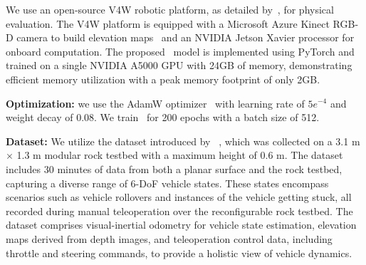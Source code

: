 
We use an open-source V4W robotic platform, as detailed by~\citet{datar2024wheeled}, for physical evaluation. The V4W platform is equipped with a Microsoft Azure Kinect RGB-D camera to build elevation maps~\cite{miki2022elevation} and an NVIDIA Jetson Xavier processor for onboard computation. The proposed \former~model is implemented using PyTorch and trained on a single NVIDIA A5000 GPU with 24GB of memory, demonstrating efficient memory utilization with a peak memory footprint of only 2GB.

\noindent\textbf{Optimization:} we use the AdamW optimizer~\cite{loshchilov2019decoupled} with learning rate of $5e^{-4}$ and weight decay of $0.08$. We train \former~for 200 epochs with a batch size of 512.



\noindent\textbf{Dataset:} We utilize the dataset introduced by \tal~\cite{datar2024terrainattentive}, which was collected on a 3.1 m $\times$ 1.3 m modular rock testbed with a maximum height of 0.6 m. The dataset includes 30 minutes of data from both a planar surface and the rock testbed, capturing a diverse range of 6-DoF vehicle states. These states encompass scenarios such as vehicle rollovers and instances of the vehicle getting stuck, all recorded during manual teleoperation over the reconfigurable rock testbed. 
The dataset comprises visual-inertial odometry for vehicle state estimation, elevation maps derived from depth images, and teleoperation control data, including throttle and steering commands, to provide a holistic view of vehicle dynamics.

